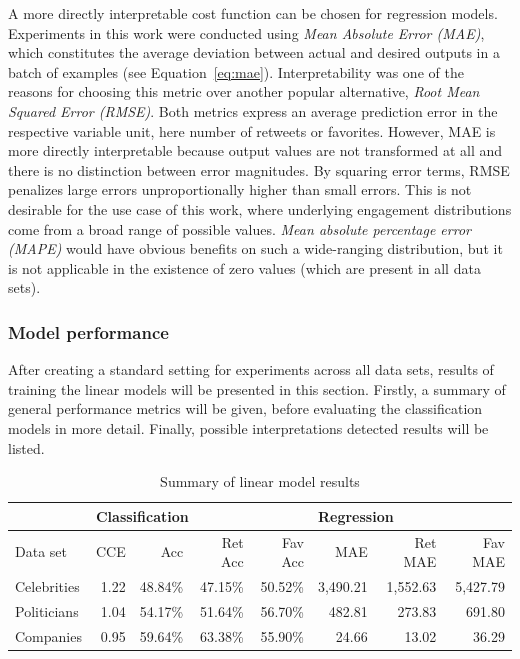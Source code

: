 A more directly interpretable cost function can be chosen for regression models.
Experiments in this work were conducted using \textit{Mean Absolute Error (MAE)},
which constitutes the average deviation between actual and desired outputs
in a batch of examples (see Equation~\ref{eq:mae}).
Interpretability was one of the reasons for choosing this metric over another popular alternative,
\textit{Root Mean Squared Error (RMSE)}.
Both metrics express an average prediction error in the respective variable unit,
here number of retweets or favorites.
However, MAE is more directly interpretable because output values
are not transformed at all and there is no distinction between error magnitudes.
By squaring error terms, RMSE penalizes large errors unproportionally higher
than small errors.
This is not desirable for the use case of this work, where underlying
engagement distributions come from a broad range of possible values.
\textit{Mean absolute percentage error (MAPE)} would have obvious benefits
on such a wide-ranging distribution, but it is not applicable in the existence
of zero values (which are present in all data sets).

\subsubsection{Model performance}
\label{sub:lin_performance}

After creating a standard setting for experiments across all data sets, 
results of training the linear models will be presented in this section.
Firstly, a summary of general performance metrics will be given, before
evaluating the classification models in more detail.
Finally, possible interpretations detected results will be listed.

\begin{table}
\centering
  \begin{tabular}{lrrrrrrr}
    \toprule
    & \multicolumn{4}{l}{Classification} & \multicolumn{3}{l}{Regression} \\
    \midrule
    Data set & CCE & Acc & Ret Acc & Fav Acc & MAE & Ret MAE & Fav MAE \\
    \midrule
    Celebrities & 1.22 & 48.84\% & 47.15\% & 50.52\% & 3,490.21 & 1,552.63 & 5,427.79 \\
    Politicians & 1.04 & 54.17\% & 51.64\% & 56.70\% & 482.81 & 273.83 & 691.80 \\
    Companies & 0.95 & 59.64\% & 63.38\% & 55.90\% & 24.66 & 13.02 & 36.29 \\
    \bottomrule
  \end{tabular}
  \caption{Summary of linear model results}
  \label{tab:lin_model_results}
\end{table}

